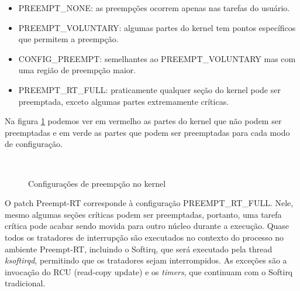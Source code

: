 \begin{itemize}
  \item PREEMPT\_NONE: as preempções ocorrem apenas nas tarefas do usuário.
  \item PREEMPT\_VOLUNTARY: algumas partes do kernel tem pontos específicos que permitem a preempção.
  \item CONFIG\_PREEMPT: semelhantes ao PREEMPT\_VOLUNTARY mas com uma região de preempção maior.
  \item PREEMPT\_RT\_FULL: praticamente qualquer seção do kernel pode ser preemptada, exceto algumas partes extremamente críticas.
\end{itemize}

Na figura \ref{grafic:Preempt} podemos ver em vermelho as partes do kernel que não podem ser preemptadas e em verde as partes que podem ser preemptadas para cada modo de configuração.

\begin{figure}[!htb]
\centering
{}%
\\
%
\caption{Configurações de preempção no kernel \cite{Huang2017}}
\label{grafic:Preempt}
\end{figure}

O patch Preempt-RT corresponde à configuração PREEMPT\_RT\_FULL. Nele, mesmo algumas seções críticas podem ser preemptadas, portanto, uma tarefa crítica pode acabar sendo movida para outro núcleo durante a execução. Quase todos os tratadores de interrupção são executados no contexto do processo no ambiente Preempt-RT, incluindo o Softirq, que será executado pela thread \textit{ksoftirqd}, permitindo que os tratadores sejam interrompidos. As exceções são a invocação do RCU (read-copy update) e os \textit{timers}, que continuam com o Softirq tradicional.

